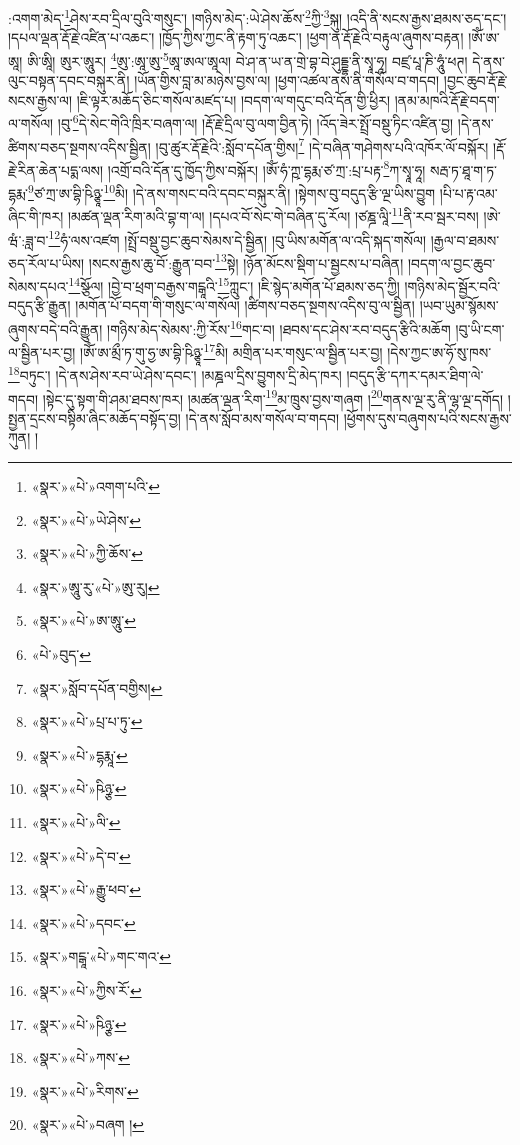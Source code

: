 :འགག་མེད་\footnote{«སྣར་»«པེ་»འགག་པའི་}ཤེས་རབ་དྲིལ་བུའི་གསུང་། །གཉིས་མེད་:ཡེ་ཤེས་ཆོས་\footnote{«སྣར་»«པེ་»ཡེ་ཤེས་}ཀྱི་\footnote{«སྣར་»«པེ་»ཀྱི་ཆོས་}སྐུ། །འདི་ནི་སངས་རྒྱས་ཐམས་ཅད་དང་། །དཔལ་ལྡན་རྡོ་རྗེ་འཛིན་པ་འཆང་། །ཁྱོད་ཀྱིས་ཀྱང་ནི་རྟག་ཏུ་འཆང་། །ཕྱག་ན་རྡོ་རྗེའི་བརྟུལ་ཞུགས་བརྟན། །ཨོཾ་ཨ་ཨཱ། ཨི་ཨཱི། ཨུར་ཨཱུར། \footnote{«སྣར་»ཨཱུ་རུ་«པེ་»ཨུ་རུ། }ཨུ་:ཨཱ་ཨུ་\footnote{«སྣར་»«པེ་»ཨ་ཨཱུ་}ཨཱ་ཨལ་ཨཱལ། བེ་ཤ་ན་ཡ་ན་གྲེ་བྷ་བེ་ཤུདྡྷ་ནི་སྭཱ་ཧཱ། བཛྲ་པཱ་ཎི་ཧཱུཾ་ཕཊ། དེ་ནས་ལུང་བསྟན་དབང་བསྐུར་ནི། །ཡོན་གྱིས་བླ་མ་མཉེས་བྱས་ལ། །ཕྱག་འཚལ་ནས་ནི་གསོལ་བ་གདབ། །བྱང་ཆུབ་རྡོ་རྗེ་སངས་རྒྱས་ལ། །ཇི་ལྟར་མཆོད་ཅིང་གསོལ་མཛད་པ། །བདག་ལ་གདུང་བའི་དོན་གྱི་ཕྱིར། །ནམ་མཁའི་རྡོ་རྗེ་བདག་ལ་གསོལ། །བུ་\footnote{«པེ་»བུད་}དེ་སེང་གེའི་ཁྲིར་བཞག་ལ། །རྡོ་རྗེ་དྲིལ་བུ་ལག་བྱིན་ཏེ། །འོད་ཟེར་སྤྲོ་བསྡུ་ཏིང་འཛིན་བྱ། །དེ་ནས་ཚིགས་བཅད་སྔགས་འདིས་སྦྱིན། །བུ་ཚུར་རྡོ་རྗེའི་:སློབ་དཔོན་གྱིས།\footnote{«སྣར་»སློབ་དཔོན་བགྱིས།} །དེ་བཞིན་གཤེགས་པའི་འཁོར་ལོ་བསྐོར། །རྡོ་རྗེ་རིན་ཆེན་པདྨ་ལས། །འགྲོ་བའི་དོན་དུ་ཁྱོད་ཀྱིས་བསྐོར། །ཨོཾ་ཧཾ་ཀྵ་དྷརྨ་ཙ་ཀྲ་:པྲ་པརྟ་\footnote{«སྣར་»«པེ་»པྲ་པ་ཏུ་}ཀ་སྭཱ་ཧཱ། སརྦ་ཏ་ཐཱ་ག་ཏ་དྷརྨ་\footnote{«སྣར་»«པེ་»དྷརྨཱ་}ཙ་ཀྲ་ཨ་བྷི་ཥིཉྩཱ་\footnote{«སྣར་»«པེ་»ཥིཉྩ་}མི། །དེ་ནས་གསང་བའི་དབང་བསྐུར་ནི། །སྟེགས་བུ་བདུད་རྩི་ལྔ་ཡིས་བྱུག །པི་པ་རྟ་འམ་ཞིང་གི་ཁར། །མཚན་ལྡན་རིག་མའི་བྷ་ག་ལ། །དཔའ་བོ་སེང་གེ་བཞིན་དུ་རོལ། །ཙཎྜ་ལཱི་\footnote{«སྣར་»«པེ་»ལི་}ནི་རབ་སྦར་བས། །ཨེ་ཝཾ་:ཟླ་བ་\footnote{«སྣར་»«པེ་»དེ་བ་}ཧཾ་ལས་འཛག །སྤྲོ་བསྡུ་བྱང་ཆུབ་སེམས་དེ་སྦྱིན། །བུ་ཡིས་མགོན་ལ་འདི་སྐད་གསོལ། །རྒྱལ་བ་ཐམས་ཅད་རོལ་པ་ཡིས། །སངས་རྒྱས་ཆུ་བོ་:རྒྱུན་བབ་\footnote{«སྣར་»«པེ་»རྒྱུ་ཕབ་}སྟེ། །ཉོན་མོངས་སྡིག་པ་སྦྱངས་པ་བཞིན། །བདག་ལ་བྱང་ཆུབ་སེམས་དཔའ་\footnote{«སྣར་»«པེ་»དབང་}སྩོལ། །བྱེ་བ་ཕྲག་བརྒྱས་གངྒཱའི་\footnote{«སྣར་»གངྒཱ་«པེ་»གང་གའ་}ཀླུང་། །ཇི་སྙེད་མགོན་པོ་ཐམས་ཅད་ཀྱི། །གཉིས་མེད་སྦྱོར་བའི་བདུད་རྩི་རྒྱུན། །མགོན་པོ་བདག་གི་གསུང་ལ་གསོལ། །ཚིགས་བཅད་སྔགས་འདིས་བུ་ལ་སྦྱིན། །ཡབ་ཡུམ་སྙོམས་ཞུགས་བདེ་བའི་རྒྱུན། །གཉིས་མེད་སེམས་:ཀྱི་རོས་\footnote{«སྣར་»«པེ་»ཀྱིས་རོ་}གང་བ། །ཐབས་དང་ཤེས་རབ་བདུད་རྩིའི་མཆོག །བུ་ཡི་ངག་ལ་སྦྱིན་པར་བྱ། །ཨོཾ་ཨ་མྲྀ་ཏ་གུ་ཧྱ་ཨ་བྷི་ཥིཉྩཱ་\footnote{«སྣར་»«པེ་»ཥིཉྩ་}མི། མགྲིན་པར་གསུང་ལ་སྦྱིན་པར་བྱ། །དེས་ཀྱང་ཨ་ཧོ་སུ་ཁས་\footnote{«སྣར་»«པེ་»ཀས་}བཏུང་། །དེ་ནས་ཤེས་རབ་ཡེ་ཤེས་དབང་། །མཎྜལ་དྲིས་བྱུགས་དྲི་མེད་ཁར། །བདུད་རྩི་དཀར་དམར་ཐིག་ལེ་གདབ། །སྟེང་དུ་སྟག་གི་ཤམ་ཐབས་ཁར། །མཚན་ལྡན་རིག་\footnote{«སྣར་»«པེ་»རིགས་}མ་ཁྲུས་བྱས་གཞག །\footnote{«སྣར་»«པེ་»བཞག །}གནས་ལྔ་རུ་ནི་ལྷ་ལྔ་དགོད། །སྤྱན་དྲངས་བསྟིམ་ཞིང་མཆོད་བསྟོད་བྱ། །དེ་ནས་སློབ་མས་གསོལ་བ་གདབ། །ཕྱོགས་དུས་བཞུགས་པའི་སངས་རྒྱས་ཀུན། །
